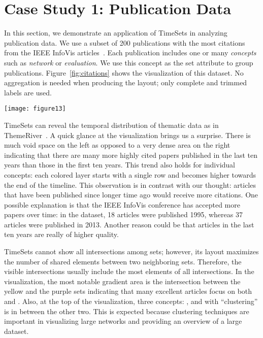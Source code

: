 \section{Case Study 1: Publication Data}
In this section, we demonstrate an application of TimeSets in analyzing publication data. We use a subset of 200 publications with the most citations from the IEEE InfoVis articles~\cite{Stasko2013}. Each publication includes one or many \emph{concepts} such as \emph{network} or \emph{evaluation}. We use this concept as the set attribute to group publications. Figure~\ref{fig:citations} shows the visualization of this dataset. No aggregation is needed when producing the layout; only complete and trimmed labels are used.

\begin{figure*}[!htb]
\centering
\texttt{[image: figure13]}
\caption{TimeSets visualization of publication data. It shows 200 articles with the most citations in the IEEE InfoVis conference from 1995 to 2013. These articles are categorized based on their concepts (see the legend in the top left hand corner).}
\label{fig:citations}
\end{figure*}

TimeSets can reveal the temporal distribution of thematic data as in ThemeRiver~\cite{Havre2002}. A quick glance at the visualization brings us a surprise. There is much void space on the left as opposed to a very dense area on the right indicating that there are many more highly cited papers published in the last ten years than those in the first ten years. This trend also holds for individual concepts: each colored layer starts with a single row and becomes higher towards the end of the timeline. This observation is in contrast with our thought: articles that have been published since longer time ago would receive more citations. One possible explanation is that the IEEE InfoVis conference has accepted more papers over time: in the dataset, 18 articles were published 1995, whereas 37 articles were published in 2013. Another reason could be that articles in the last ten years are really of higher quality.

TimeSets cannot show all intersections among sets; however,  its layout maximizes the number of shared elements between two neighboring sets. Therefore, the visible intersections usually include the most elements of all intersections. In the visualization, the most notable gradient area is the intersection between the yellow and the purple sets indicating that many excellent articles focus on both \tsevaluation{} and \tsinteraction. Also, at the top of the visualization, three concepts: \tsnetwork, \tsclustering{} and \tsoverview{} with ``clustering'' is in between the other two. This is expected because clustering techniques are important in visualizing large networks and providing an  overview of a large dataset.

